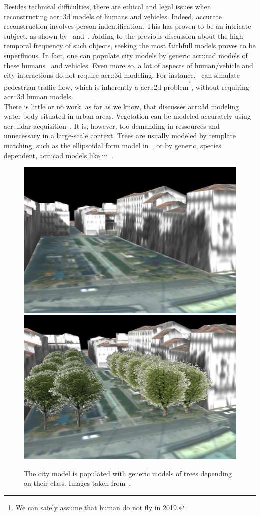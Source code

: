             Besides technical difficulties, there are ethical and legal issues when reconstructing \gls{acr::3d} models of humans and vehicles.
            Indeed, accurate reconstruction involves person indentification.
            This has proven to be an intricate subject, as shown by~\textcite{tavani2011ethics} and~\textcite{thornton2010individual}.
            Adding to the previous discussion about the high temporal frequency of such objects, seeking the most faithfull models proves to be superfluous.
            In fact, one can populate city models by generic \gls{acr::cad} models of these humans~\parencite{shao2007autonomous} and vehicles.
            Even more so, a lot of aspects of human/vehicle and city interactions do not require \gls{acr::3d} modeling.
            For instance,~\textcite{lovaas1994modeling} can simulate pedestrian traffic flow, which is inherently a \gls{acr::2d} problem\footnote{
                We can safely assume that human do not fly in 2019.
            }, without requiring \gls{acr::3d} human models.\\
            There is little or no work, as far as we know, that discusses \gls{acr::3d} modeling water body situated in urban areas.
            Vegetation can be modeled accurately using \gls{acr::lidar} acquisition~\parencite{omasa20063d}.
            It is, however, too demanding in ressources and unnecessary in a large-scale context.
            Trees are usually modeled by template matching, such as the ellipsoidal form model in~\textcite{lafarge2012creating}, or by generic, species dependent, \gls{acr::cad} models like in~\textcite{iovan2008detection}.\\
            \begin{figure}[htpb]
                \centering
                \includegraphics[width=.45\textwidth]{images/introduction/modeling_trees_1}
                \includegraphics[width=.45\textwidth]{images/introduction/modeling_trees_2}
                \caption[
                    The city model is populated with generic models of trees depending on their class.
                ]{
                    \label{fig::3d_tree_models}
                    The city model is populated with generic models of trees depending on their class.
                    Images taken from~\parencite{iovan2008detection}.
                }
            \end{figure}
